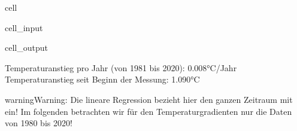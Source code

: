 \documentclass[letterpaper,10pt,english]{jupyterBook}
\begin{document}
\begin{sphinxuseclass}{cell}\begin{sphinxVerbatimInput}

\begin{sphinxuseclass}{cell_input}
\begin{sphinxVerbatim}[commandchars=\\\{\}]
\PYG{p}{[}\PYG{p}{]}\PYG{p}{[}\PYG{p}{]}
\PYG{p}{[}\PYG{p}{]}\PYG{p}{[}\PYG{p}{]}
\end{sphinxVerbatim}

\end{sphinxuseclass}\end{sphinxVerbatimInput}
\begin{sphinxVerbatimOutput}

\begin{sphinxuseclass}{cell_output}
\begin{sphinxVerbatim}[commandchars=\\\{\}]
Temperaturanstieg pro Jahr (von 1981 bis 2020): 0.008°C/Jahr
Temperaturanstieg seit Beginn der Messung: 1.090°C
\end{sphinxVerbatim}

\end{sphinxuseclass}\end{sphinxVerbatimOutput}

\end{sphinxuseclass}
\begin{sphinxadmonition}{warning}{Warning:}
\sphinxAtStartPar
Die lineare Regression bezieht hier den ganzen Zeitraum mit ein! Im folgenden betrachten wir für den Temperaturgradienten nur die Daten von 1980 bis 2020!
\end{sphinxadmonition}
\end{document}
